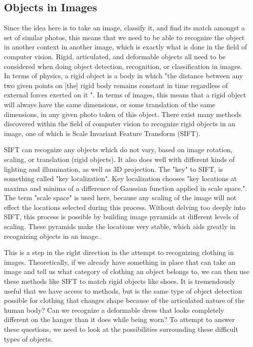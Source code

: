 \documentclass[12pt]{report} %
\begin{document}
\subsection{Objects in Images}

	Since the idea here is to take an image, classify it, and find its match amongst a set of similar photos, this means that we need to be able to recognize the object in another context in another image, which is exactly what is done in the field of computer vision. Rigid, articulated, and deformable objects all need to be considered when doing object detection, recognition, or classification in images. In terms of physics, a rigid object is a body in which "the distance between any two given points on [the] rigid body remains constant in time regardless of external forces exerted on it "\cite{RigidBodyWiki}. In terms of images, this means that a rigid object will always have the same dimensions, or some translation of the same dimensions, in any given photo taken of this object. There exist many methods discovered within the field of computer vision to recognize rigid objects in an image, one of which is Scale Invariant Feature Transform (SIFT)\cite{lowe1999object}. 
	
	SIFT can recognize any objects which do not vary, based on image rotation, scaling, or translation (rigid objects). It also does well with different kinds of lighting and illumination, as well as 3D projection\cite{lowe1999object}. The "key" to SIFT, is something called "key localization". Key localization chooses "key locations at maxima and minima of a difference of Gaussian function applied in scale space."\cite{lowe1999object}. The term "scale space" is used here, because any scaling of the image will not effect the locations selected during this process. Without delving too deeply into SIFT, this process is possible by building image pyramids at different levels of scaling. These pyramids make the locations very stable, which aids greatly in recognizing objects in an image.\cite{lowe1999object}.

	This is a step in the right direction in the attempt to recognizing clothing in images. Theoretically, if we already have something in place that can take an image and tell us what category of clothing an object belongs to, we can then use these methods like SIFT to match rigid objects like shoes. It is tremendously useful that we have access to methods, but is the same type of object detection possible for clothing that changes shape because of the articulated nature of the human body? Can we recognize a deformable dress that looks completely different on the hanger than it does while being worn? To attempt to answer these questions, we need to look at the possibilities surrounding these difficult types of objects. 
	
\end{document}
